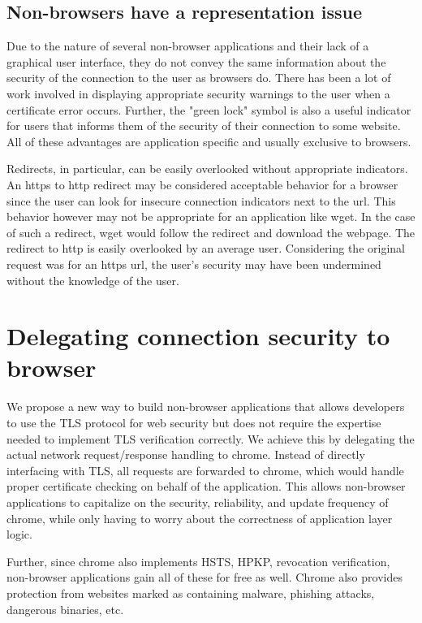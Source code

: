 \subsection{Non-browsers have a representation issue}
Due to the nature of several non-browser applications and their lack of a
graphical user interface, they do not convey the same information about the
security of the connection to the user as browsers do. There has been a lot of
work involved in displaying appropriate security warnings to the user when a
certificate error occurs. Further, the "green lock" symbol is also a useful
indicator for users that informs them of the security of their connection to
some website. All of these advantages are application specific and usually
exclusive to browsers.

Redirects, in particular, can be easily overlooked without appropriate
indicators. An https to http redirect may be considered acceptable behavior for
a browser since the user can look for insecure connection indicators next to
the url. This behavior however may not be appropriate for an application like
wget. In the case of such a redirect, wget would follow the redirect and download
the webpage. The redirect to http is easily overlooked by an average user.
Considering the original request was for an https url, the user's security
may have been undermined without the knowledge of the user.


\section{Delegating connection security to browser}
\label{sec:solution-saber}

We propose a new way to build non-browser applications that allows developers
to use the TLS protocol for web security but does not require the expertise
needed to implement TLS verification correctly. We achieve this by delegating
the actual network request/response handling to chrome. Instead of directly
interfacing with TLS, all requests are forwarded to chrome, which would handle
proper certificate checking on behalf of the application. This allows non-browser
applications to capitalize on the security, reliability, and update frequency of
chrome, while only having to worry about the correctness of application layer
logic.

Further, since chrome also implements HSTS, HPKP, revocation verification, non-browser
applications gain all of these for free as well. Chrome also provides protection
from websites marked as containing malware, phishing attacks, dangerous binaries, etc.

